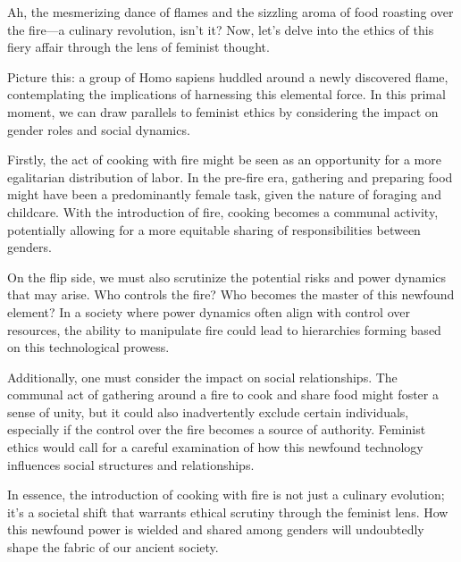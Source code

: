 Ah, the mesmerizing dance of flames and the sizzling aroma of food roasting over the fire—a culinary revolution, isn't it? Now, let's delve into the ethics of this fiery affair through the lens of feminist thought.

Picture this: a group of Homo sapiens huddled around a newly discovered flame, contemplating the implications of harnessing this elemental force. In this primal moment, we can draw parallels to feminist ethics by considering the impact on gender roles and social dynamics.

Firstly, the act of cooking with fire might be seen as an opportunity for a more egalitarian distribution of labor. In the pre-fire era, gathering and preparing food might have been a predominantly female task, given the nature of foraging and childcare. With the introduction of fire, cooking becomes a communal activity, potentially allowing for a more equitable sharing of responsibilities between genders.

On the flip side, we must also scrutinize the potential risks and power dynamics that may arise. Who controls the fire? Who becomes the master of this newfound element? In a society where power dynamics often align with control over resources, the ability to manipulate fire could lead to hierarchies forming based on this technological prowess.

Additionally, one must consider the impact on social relationships. The communal act of gathering around a fire to cook and share food might foster a sense of unity, but it could also inadvertently exclude certain individuals, especially if the control over the fire becomes a source of authority. Feminist ethics would call for a careful examination of how this newfound technology influences social structures and relationships.

In essence, the introduction of cooking with fire is not just a culinary evolution; it's a societal shift that warrants ethical scrutiny through the feminist lens. How this newfound power is wielded and shared among genders will undoubtedly shape the fabric of our ancient society.